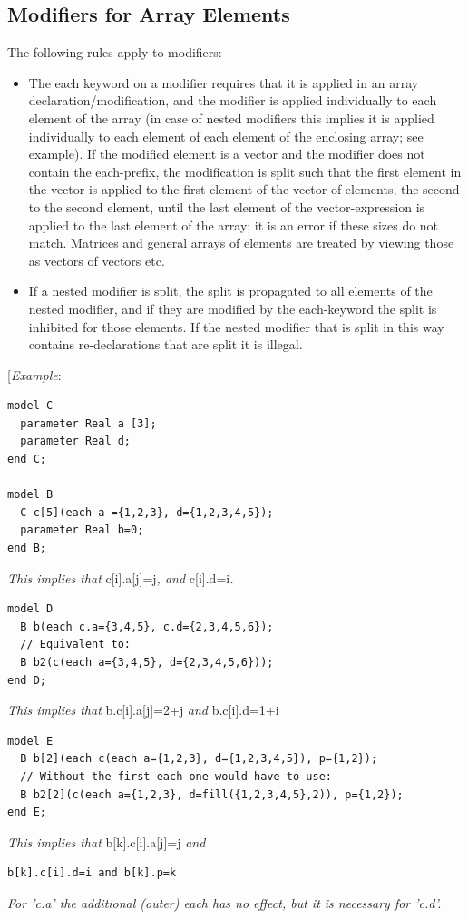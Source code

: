 \documentclass[10pt,a4paper]{report}
\def\doublelabel#1{\label{#1}}
\begin{document}
\subsection{Modifiers for Array Elements}\doublelabel{modifiers-for-array-elements}

The following rules apply to modifiers:

\begin{itemize}
\item
  The each keyword on a modifier requires that it is applied in an array
  declaration/modification, and the modifier is applied individually to
  each element of the array (in case of nested modifiers this implies it
  is applied individually to each element of each element of the
  enclosing array; see example). If the modified element is a vector and
  the modifier does not contain the each-prefix, the modification is
  split such that the first element in the vector is applied to the
  first element of the vector of elements, the second to the second
  element, until the last element of the vector-expression is applied to
  the last element of the array; it is an error if these sizes do not
  match. Matrices and general arrays of elements are treated by viewing
  those as vectors of vectors etc.
\item
  If a nested modifier is split, the split is propagated to all elements
  of the nested modifier, and if they are modified by the each-keyword
  the split is inhibited for those elements. If the nested modifier that
  is split in this way contains re-declarations that are split it is
  illegal.
\end{itemize}

{[}\emph{Example}:
\begin{lstlisting}[language=modelica]
model C
  parameter Real a [3];
  parameter Real d;
end C;

model B
  C c[5](each a ={1,2,3}, d={1,2,3,4,5});
  parameter Real b=0;
end B;
\end{lstlisting}

\emph{This implies that} c{[}i{]}.a{[}j{]}=j\emph{, and}
c{[}i{]}.d=i\emph{.}
\begin{lstlisting}[language=modelica]
model D
  B b(each c.a={3,4,5}, c.d={2,3,4,5,6});
  // Equivalent to:
  B b2(c(each a={3,4,5}, d={2,3,4,5,6}));
end D;
\end{lstlisting}

\emph{This implies that} b.c{[}i{]}.a{[}j{]}=2+j \emph{and}
b.c{[}i{]}.d=1+i
\begin{lstlisting}[language=modelica]
model E
  B b[2](each c(each a={1,2,3}, d={1,2,3,4,5}), p={1,2});
  // Without the first each one would have to use:
  B b2[2](c(each a={1,2,3}, d=fill({1,2,3,4,5},2)), p={1,2});
end E;
\end{lstlisting}
\emph{This implies that} b{[}k{]}.c{[}i{]}.a{[}j{]}=j \emph{and}
\begin{lstlisting}[language=modelica]
  b[k].c[i].d=i and b[k].p=k
\end{lstlisting}
\emph{For 'c.a' the additional (outer) each has no effect, but it is
necessary for 'c.d'.}
\end{document}
